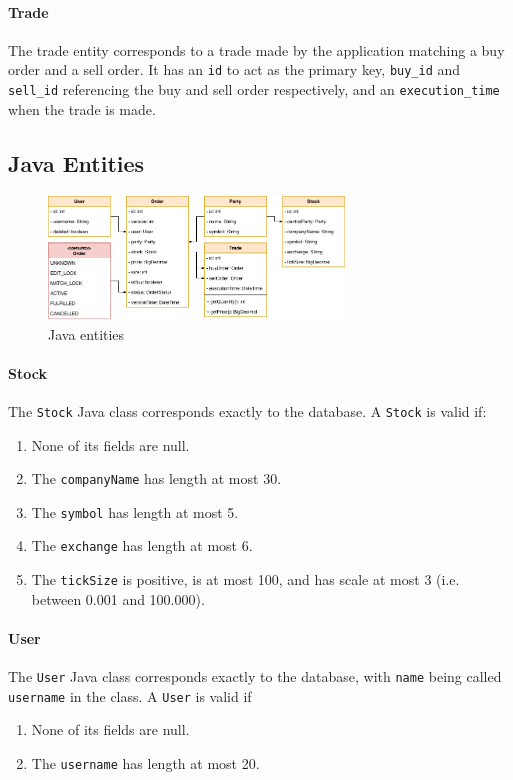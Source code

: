 \documentclass{article}
\begin{document}
\paragraph{Trade} The trade entity corresponds to a trade made by the application matching a buy order and a sell order. It has an \texttt{id} to act as the primary key, \texttt{buy\_id} and \texttt{sell\_id} referencing the buy and sell order respectively, and an \texttt{execution\_time} when the trade is made.

\subsection{Java Entities}

\begin{figure}[h]
    \centering
    \includegraphics[width=0.7\textwidth]{entities.png}
    \caption{Java entities}
\end{figure}

\paragraph{Stock} The \texttt{Stock} Java class corresponds exactly to the database. A \texttt{Stock} is valid if:
\begin{enumerate}
    \item None of its fields are null.
    \item The \texttt{companyName} has length at most 30.
    \item The \texttt{symbol} has length at most 5.
    \item The \texttt{exchange} has length at most 6.
    \item The \texttt{tickSize} is positive, is at most 100, and has scale at most 3 (i.e. between 0.001 and 100.000).
\end{enumerate}


\paragraph{User} The \texttt{User} Java class corresponds exactly to the database, with \texttt{name} being called \texttt{username} in the class. A \texttt{User} is valid if
\begin{enumerate}
    \item None of its fields are null.
    \item The \texttt{username} has length at most 20.
\end{enumerate}
\end{document}
